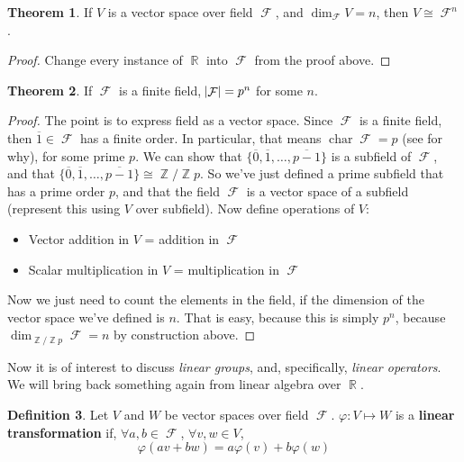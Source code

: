 \documentclass[11pt]{amsart} %
\theoremstyle{definition}
\newtheorem{definition}{Definition}[section]
\newtheorem{theorem}[definition]{Theorem}
\theoremstyle{definition}
\newtheorem{remark}[definition]{Remark}
\DeclareMathOperator{\R}{\mathbb{R}}
\DeclareMathOperator{\Z}{\mathbb{Z}}
\DeclareMathOperator{\FF}{\mathcal{F}}
\DeclareMathOperator{\charr}{char}
\numberwithin{equation}{section}
\begin{document}
\begin{theorem}
	If $V$ is a vector space over field $\FF$, and $\dim_{\FF} V=n$, then $V \cong \FF^n$.
\end{theorem}

\begin{proof}
	Change every instance of $\R$ into $\FF$ from the proof above.
\end{proof}

\begin{theorem}
	If $\FF$ is a finite field, $\abs{\FF} = p^n$ for some $n$.
\end{theorem}

\begin{proof}
	The point is to express field as a vector space. Since $\FF$ is a finite field, then $\overline{ 1}\in \FF$ has a finite order. In particular, that means $\charr \FF = p$ (see  for why), for some prime $p$. We can show that $\{\overline{ 0}, \overline{ 1}, \dots,\overline{ p-1}  \}$ is a subfield of $\FF$, and that $\{\overline{ 0}, \overline{ 1}, \dots,\overline{ p-1}  \} \cong \Z / \Z p$. So we've just defined a prime subfield that has a prime order $p$, and that the field $\FF$ is a vector space of a subfield (represent this using $V$ over subfield). Now define operations of $V$:
	\begin{itemize}%
		\item Vector addition in $V$ = addition in $\FF$
		\item Scalar multiplication in $V$ = multiplication in $\FF$
	\end{itemize}
	Now we just need to count the elements in the field, if the dimension of the vector space we've defined is $n$. That is easy, because this is simply $p^n$, because $\dim_{\Z / \Z p } \FF =n$ by construction above.
\end{proof}


Now it is of interest to discuss \textit{linear groups}, and, specifically, \textit{linear operators}. We will bring back something again from linear algebra over $\R$.

\begin{definition}
	Let $V$ and $W$ be vector spaces over field $\FF$. $\varphi : V \mapsto W$ is a \textbf{linear transformation} if, $\forall a,b \in \FF$, $\forall v,w \in V$,
	$$  \varphi (av + bw) = a \varphi (v) + b \varphi (w)$$
\end{definition}
\end{document}
